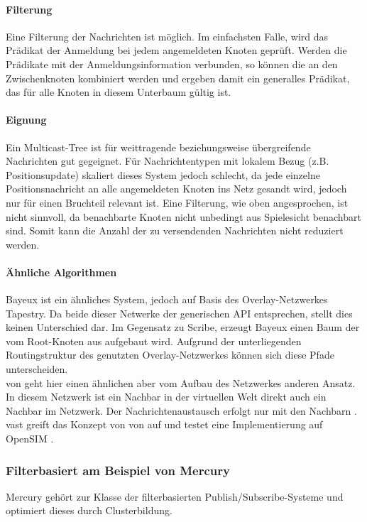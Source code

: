 \paragraph*{Filterung}
Eine Filterung der Nachrichten ist möglich. Im einfachsten Falle, wird das Prädikat der Anmeldung bei jedem angemeldeten Knoten geprüft. Werden die Prädikate mit der Anmeldungsinformation verbunden, so können die an den Zwischenknoten kombiniert werden und ergeben damit ein generalles Prädikat, das für alle Knoten in diesem Unterbaum gültig ist.

\paragraph*{Eignung}
Ein Multicast-Tree ist für weittragende beziehungsweise übergreifende Nachrichten gut gegeignet. Für Nachrichtentypen mit lokalem Bezug (z.B. Positionsupdate) skaliert dieses System jedoch schlecht, da jede einzelne Positionsnachricht an alle angemeldeten Knoten ins Netz gesandt wird, jedoch nur für einen Bruchteil relevant ist. Eine Filterung, wie oben angesprochen, ist nicht sinnvoll, da benachbarte Knoten nicht unbedingt aus Spielesicht benachbart sind. Somit kann die Anzahl der zu versendenden Nachrichten nicht reduziert werden.

\paragraph*{Ähnliche Algorithmen}
Bayeux \cite{Zhuang2001} ist ein ähnliches System, jedoch auf Basis des Overlay-Netzwerkes Tapestry. Da beide dieser Netwerke der generischen API entsprechen, stellt dies keinen Unterschied dar. Im Gegensatz zu Scribe, erzeugt Bayeux einen Baum der vom Root-Knoten aus aufgebaut wird. Aufgrund der unterliegenden Routingstruktur des genutzten Overlay-Netzwerkes können sich diese Pfade unterscheiden.\\
\ac{von} geht hier einen ähnlichen aber vom Aufbau des Netzwerkes anderen Ansatz. In diesem Netzwerk ist ein Nachbar in der virtuellen Welt direkt auch ein Nachbar im Netzwerk. Der Nachrichtenaustausch erfolgt nur mit den Nachbarn \cite{Hu2006VON}. \ac{vast} \cite{Backhaus2007Voronoibased} greift das Konzept von \ac{von} auf und testet eine Implementierung auf OpenSIM \cite{Baumgart2007OverSim}.



\subsubsection{Filterbasiert am Beispiel von Mercury}
\label{chap:related:mercury}
Mercury \cite{Bharambe2004Mercury} gehört zur Klasse der filterbasierten Publish/Subscribe-Systeme und optimiert dieses durch Clusterbildung.

